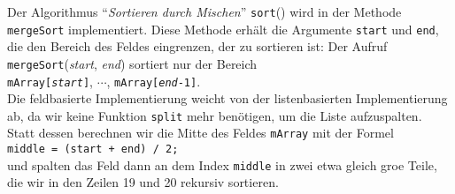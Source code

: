 Der Algorithmus ``\emph{Sortieren durch Mischen}'' \texttt{sort}() wird in der Methode
\texttt{mergeSort} implementiert.  Diese Methode erh\"alt die Argumente  \texttt{start} und
\texttt{end}, die den  Bereich des Feldes eingrenzen, der zu sortieren ist: 
Der Aufruf \texttt{mergeSort}(\textsl{start}, \textsl{end}) sortiert nur der Bereich \\[0.2cm]
\hspace*{1.3cm} \texttt{mArray[\textsl{start}]}, $\cdots$, \texttt{mArray[\textsl{end}-1]}. \\[0.2cm]
Die feldbasierte Implementierung  weicht von der listenbasierten Implementierung ab, da
wir keine Funktion \texttt{split} mehr ben\"otigen, um die Liste aufzuspalten. 
Statt dessen berechnen wir die Mitte des Feldes
\texttt{mArray} mit der Formel \\[0.2cm]
\hspace*{1.3cm} \texttt{middle = (start + end) / 2;} \\[0.2cm]
und spalten das Feld dann an dem Index \texttt{middle} in zwei etwa gleich gro\3e
Teile, die wir in den Zeilen 19 und 20 rekursiv sortieren.

